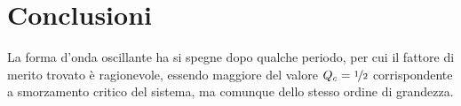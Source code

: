 \documentclass{article}[a4paper, 12pt, italian]
\begin{document}
\section{Conclusioni}
La forma d'onda oscillante ha si spegne dopo qualche periodo, per cui
il fattore di merito trovato è ragionevole, essendo maggiore del valore
$Q_c = \nicefrac{1}{2}$ corrispondente a smorzamento critico del sistema,
ma comunque dello stesso ordine di grandezza.

\end{document}
